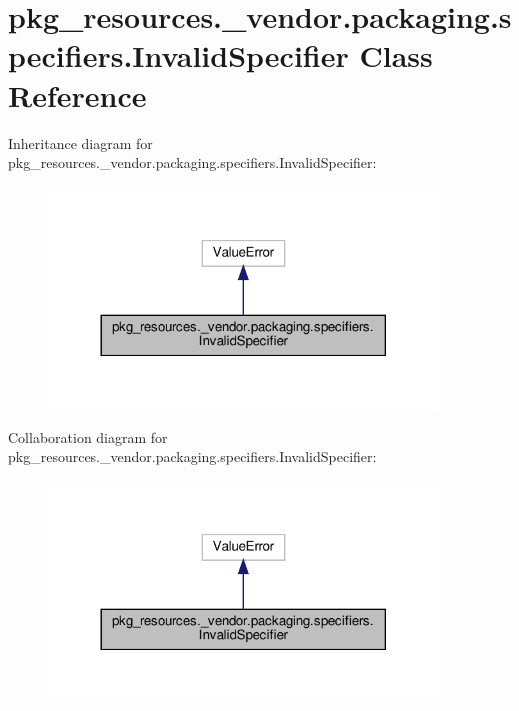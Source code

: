 \hypertarget{classpkg__resources_1_1__vendor_1_1packaging_1_1specifiers_1_1InvalidSpecifier}{}\section{pkg\+\_\+resources.\+\_\+vendor.\+packaging.\+specifiers.\+Invalid\+Specifier Class Reference}
\label{classpkg__resources_1_1__vendor_1_1packaging_1_1specifiers_1_1InvalidSpecifier}


Inheritance diagram for pkg\+\_\+resources.\+\_\+vendor.\+packaging.\+specifiers.\+Invalid\+Specifier\+:
\nopagebreak
\begin{figure}[H]
\begin{center}
\leavevmode
\includegraphics[width=293pt]{classpkg__resources_1_1__vendor_1_1packaging_1_1specifiers_1_1InvalidSpecifier__inherit__graph}
\end{center}
\end{figure}


Collaboration diagram for pkg\+\_\+resources.\+\_\+vendor.\+packaging.\+specifiers.\+Invalid\+Specifier\+:
\nopagebreak
\begin{figure}[H]
\begin{center}
\leavevmode
\includegraphics[width=293pt]{classpkg__resources_1_1__vendor_1_1packaging_1_1specifiers_1_1InvalidSpecifier__coll__graph}
\end{center}
\end{figure}


